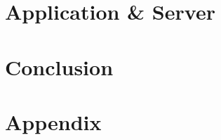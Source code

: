 \documentclass[ a4paper 11pt oneside onecolumn final openany ]{report}
\begin{document}
    \chapter{Application \& Server}
    

    \chapter{Conclusion}
    

    \newpage

    
    

    \chapter{Appendix}
    
\end{document}

